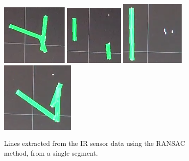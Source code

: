 \documentclass[10pt,a4paper,twocolumn]{article}
\begin{document}
\begin{figure}
  \centering
  \includegraphics[width=0.4\linewidth]{images/ransac1.png}
  \includegraphics[width=0.4\linewidth]{images/ransac2.png}
  \includegraphics[width=0.4\linewidth]{images/ransac3.png}
  \includegraphics[width=0.4\linewidth]{images/ransac4.png}
  \caption{Lines extracted from the IR sensor data using the RANSAC method, from
  a single segment.}
  \label{fig:rsacseg}
\end{figure}
\end{document}
